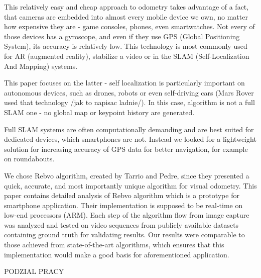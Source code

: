 
This relatively easy and cheap approach to odometry takes advantage of a fact, that cameras are embedded into almost every mobile device we own, no matter how expensive they are - game consoles, phones, even smartwatches. Not every of those devices has a gyroscope, and even if they use GPS (Global Positioning System), its accuracy is relatively low. This technology is most commonly used for AR (augmented reality), stabilize a video or in the SLAM (Self-Localization And Mapping) systems.

This paper focuses on the latter - self localization is particularly important on autonomous devices, such as drones, robots or even self-driving cars (Mars Rover used that technology /jak to napisac ladnie/). In this case, algorithm is not a full SLAM one - no global map or keypoint history are generated.

\cite{pineco}
\cite{androidvr} 

Full SLAM systems are often computationally demanding and are best suited for dedicated devices, which smartphones are not. Instead we looked for a lightweight solution for increasing accuracy of GPS data for better navigation, for example on roundabouts.

We chose Rebvo algorithm, created by Tarrio and Pedre, since they presented a quick, accurate, and most importantly unique algorithm for visual odometry. This paper contains detailed analysis of Rebvo algorithm which is a prototype for smartphone application. Their implementation is supposed to be real-time on low-end processors (ARM).
Each step of the algorithm flow from image capture was analyzed and tested on video sequences from publicly available datasets containing ground truth for validating results. Our results were comparable to those achieved from state-of-the-art algorithms, which ensures that this implementation would make a good basis for aforementioned application.

PODZIAL PRACY

\clearpage 
